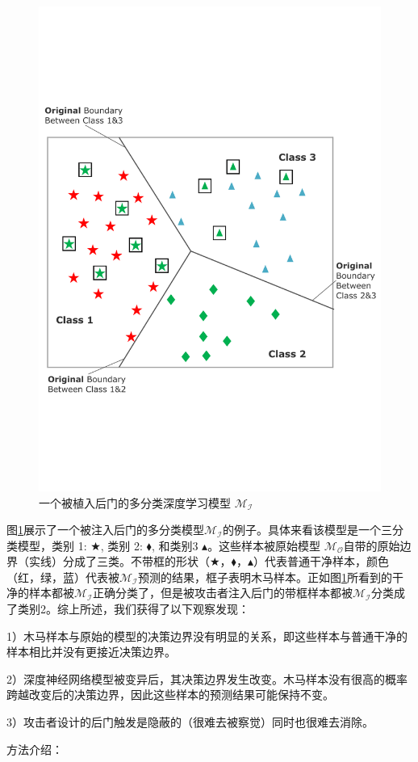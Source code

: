 \documentclass[fontset=macnew,UTF8]{article} %
\begin{document}
\begin{figure}[h]
	\centering
	\includegraphics[width=0.6\linewidth]{Backdoor.pdf}
	\caption{一个被植入后门的多分类深度学习模型 $\mathcal{M}_\mathcal{I}$}
	\label{Backdoor_injected_model}
\end{figure}

图\ref{Backdoor_injected_model}展示了一个被注入后门的多分类模型$\mathcal{M}_\mathcal{I}$的例子。具体来看该模型是一个三分类模型，类别 1: $\bigstar$, 类别 2: $\blacklozenge$, 和类别3 $\blacktriangle$。这些样本被原始模型 $\mathcal{M}_\mathcal{O}$自带的原始边界（实线）分成了三类。不带框的形状（$\bigstar$，$\blacklozenge$，$\blacktriangle$）代表普通干净样本，颜色（红，绿，蓝）代表被$\mathcal{M}_\mathcal{I}$预测的结果，框子表明木马样本。正如图\ref{Backdoor_injected_model}所看到的干净的样本都被$\mathcal{M}_\mathcal{I}$正确分类了，但是被攻击者注入后门的带框样本都被$\mathcal{M}_\mathcal{I}$分类成了类别2。综上所述，我们获得了以下观察发现：

1）木马样本与原始的模型的决策边界没有明显的关系，即这些样本与普通干净的样本相比并没有更接近决策边界。

2）深度神经网络模型被变异后，其决策边界发生改变。木马样本没有很高的概率跨越改变后的决策边界，因此这些样本的预测结果可能保持不变。

3）攻击者设计的后门触发是隐蔽的（很难去被察觉）同时也很难去消除。


方法介绍：
\end{document}
